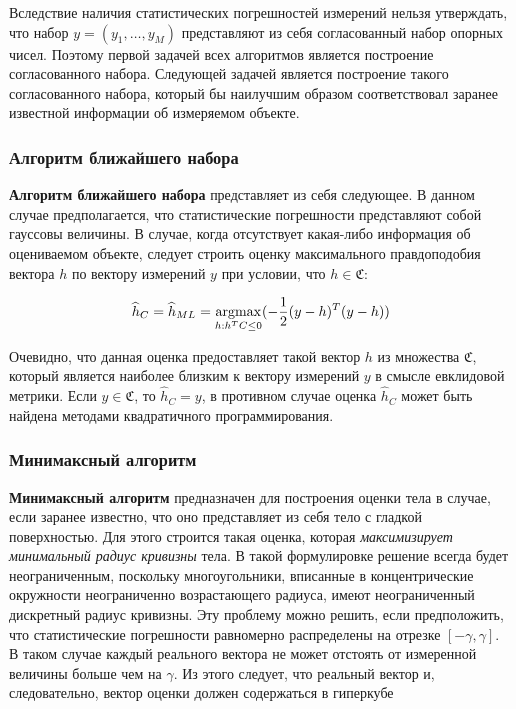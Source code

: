 \documentclass[a4paper,12pt, titlepage]{article}
\begin{document}
Вследствие наличия статистических погрешностей измерений нельзя утверждать, что
набор $y = (y_{1}, \ldots, y_{M})$ представляют из себя согласованный набор
опорных чисел. Поэтому первой задачей всех алгоритмов является построение
согласованного набора. Следующей задачей является построение такого
согласованного набора, который бы наилучшим образом соответствовал заранее
известной информации об измеряемом объекте.

\subsubsection{Алгоритм ближайшего набора}

\textbf{Алгоритм ближайшего набора} представляет из себя следующее. В данном
случае предполагается, что статистические погрешности представляют собой
гауссовы величины. В случае, когда отсутствует какая-либо информация об
оцениваемом объекте, следует строить оценку максимального правдоподобия вектора
$h$ по вектору измерений $y$ при условии, что $h \in \mathfrak{C}$:

$$
\widehat{h}_{C} = \widehat{h}_{ML} =
\operatornamewithlimits{argmax}_{h: h^{T} C \leq 0}
( - \frac{1}{2} (y - h)^{T} (y - h))
$$

Очевидно, что данная оценка предоставляет такой вектор $h$ из множества
$\mathfrak{C}$, который является наиболее близким к вектору измерений $y$ в
смысле евклидовой метрики. Если $y \in \mathfrak{C}$, то $\widehat{h}_{C} = y$,
в противном случае оценка $\widehat{h}_{C}$ может быть найдена методами
квадратичного программирования.

\subsubsection{Минимаксный алгоритм}


\textbf{Минимаксный алгоритм} предназначен для построения
оценки тела в случае, если заранее известно, что оно представляет из себя тело
с гладкой поверхностью. Для этого строится такая оценка, которая
\textit{максимизирует минимальный радиус кривизны} тела. В такой формулировке
решение всегда будет неограниченным, поскольку многоугольники, вписанные в
концентрические окружности неограниченно возрастающего радиуса, имеют
неограниченный дискретный радиус кривизны. Эту проблему можно решить, если
предположить, что статистические погрешности равномерно распределены на отрезке
$[ - \gamma, \gamma]$. В таком случае каждый реального вектора не может
отстоять от измеренной величины больше чем на $\gamma$. Из этого следует, что
реальный вектор и, следовательно, вектор оценки должен содержаться в гиперкубе
\end{document}
